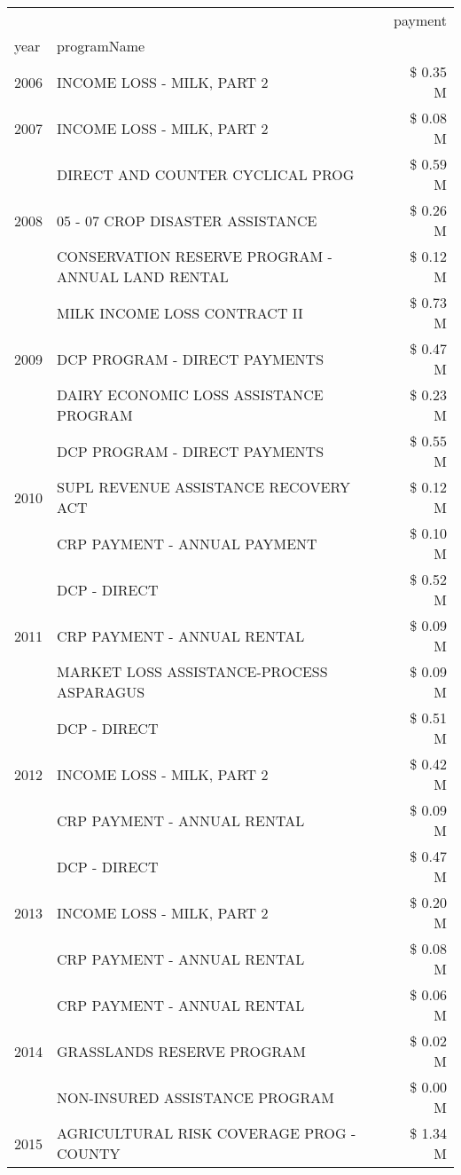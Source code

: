 \begin{tabular}{llr}
\toprule
 &  & payment \\
year & programName &  \\
\midrule
2006 & INCOME LOSS - MILK, PART 2 & \$ 0.35 M \\
\cline{1-3}
2007 & INCOME LOSS - MILK, PART 2 & \$ 0.08 M \\
\cline{1-3}
\multirow[t]{3}{*}{2008} & DIRECT AND COUNTER CYCLICAL PROG & \$ 0.59 M \\
 & 05 - 07 CROP DISASTER ASSISTANCE & \$ 0.26 M \\
 & CONSERVATION RESERVE PROGRAM - ANNUAL LAND RENTAL & \$ 0.12 M \\
\cline{1-3}
\multirow[t]{3}{*}{2009} & MILK INCOME LOSS CONTRACT II & \$ 0.73 M \\
 & DCP PROGRAM - DIRECT PAYMENTS & \$ 0.47 M \\
 & DAIRY ECONOMIC LOSS ASSISTANCE PROGRAM & \$ 0.23 M \\
\cline{1-3}
\multirow[t]{3}{*}{2010} & DCP PROGRAM - DIRECT PAYMENTS & \$ 0.55 M \\
 & SUPL REVENUE ASSISTANCE RECOVERY ACT & \$ 0.12 M \\
 & CRP PAYMENT - ANNUAL PAYMENT & \$ 0.10 M \\
\cline{1-3}
\multirow[t]{3}{*}{2011} & DCP - DIRECT & \$ 0.52 M \\
 & CRP PAYMENT - ANNUAL RENTAL & \$ 0.09 M \\
 & MARKET LOSS ASSISTANCE-PROCESS ASPARAGUS & \$ 0.09 M \\
\cline{1-3}
\multirow[t]{3}{*}{2012} & DCP - DIRECT & \$ 0.51 M \\
 & INCOME LOSS - MILK, PART 2 & \$ 0.42 M \\
 & CRP PAYMENT - ANNUAL RENTAL & \$ 0.09 M \\
\cline{1-3}
\multirow[t]{3}{*}{2013} & DCP - DIRECT & \$ 0.47 M \\
 & INCOME LOSS - MILK, PART 2 & \$ 0.20 M \\
 & CRP PAYMENT - ANNUAL RENTAL & \$ 0.08 M \\
\cline{1-3}
\multirow[t]{3}{*}{2014} & CRP PAYMENT - ANNUAL RENTAL & \$ 0.06 M \\
 & GRASSLANDS RESERVE PROGRAM & \$ 0.02 M \\
 & NON-INSURED ASSISTANCE PROGRAM & \$ 0.00 M \\
\cline{1-3}
\multirow[t]{3}{*}{2015} & AGRICULTURAL RISK COVERAGE PROG - COUNTY & \$ 1.34 M \\

\end{tabular}
